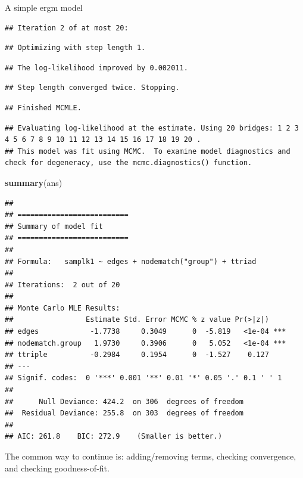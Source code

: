 \documentclass[10pt,ignorenonframetext,handout,aspectratio=169,]{beamer}
\newenvironment{Shaded}{\begin{snugshade}}{\end{snugshade}}
\newcommand{\KeywordTok}[1]{\textcolor[rgb]{0.13,0.29,0.53}{\textbf{#1}}}
\newcommand{\NormalTok}[1]{#1}
\begin{document}
\begin{frame}[fragile]{A simple ergm model}
\begin{verbatim}
## Iteration 2 of at most 20:
\end{verbatim}

\begin{verbatim}
## Optimizing with step length 1.
\end{verbatim}

\begin{verbatim}
## The log-likelihood improved by 0.002011.
\end{verbatim}

\begin{verbatim}
## Step length converged twice. Stopping.
\end{verbatim}

\begin{verbatim}
## Finished MCMLE.
\end{verbatim}

\begin{verbatim}
## Evaluating log-likelihood at the estimate. Using 20 bridges: 1 2 3 4 5 6 7 8 9 10 11 12 13 14 15 16 17 18 19 20 .
## This model was fit using MCMC.  To examine model diagnostics and check for degeneracy, use the mcmc.diagnostics() function.
\end{verbatim}

\normalsize

\end{frame}

\begin{frame}[fragile]

\footnotesize

\begin{Shaded}
\begin{Highlighting}[]
\KeywordTok{summary}\NormalTok{(ans)}
\end{Highlighting}
\end{Shaded}

\begin{verbatim}
## 
## ==========================
## Summary of model fit
## ==========================
## 
## Formula:   samplk1 ~ edges + nodematch("group") + ttriad
## 
## Iterations:  2 out of 20 
## 
## Monte Carlo MLE Results:
##                 Estimate Std. Error MCMC % z value Pr(>|z|)    
## edges            -1.7738     0.3049      0  -5.819   <1e-04 ***
## nodematch.group   1.9730     0.3906      0   5.052   <1e-04 ***
## ttriple          -0.2984     0.1954      0  -1.527    0.127    
## ---
## Signif. codes:  0 '***' 0.001 '**' 0.01 '*' 0.05 '.' 0.1 ' ' 1
## 
##      Null Deviance: 424.2  on 306  degrees of freedom
##  Residual Deviance: 255.8  on 303  degrees of freedom
##  
## AIC: 261.8    BIC: 272.9    (Smaller is better.)
\end{verbatim}

\normalsize

The common way to continue is: adding/removing terms, checking
convergence, and checking goodness-of-fit.

\end{frame}
\end{document}
